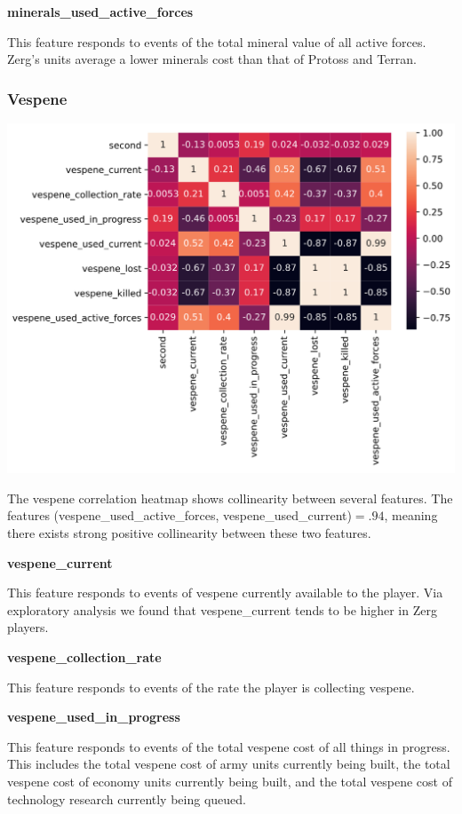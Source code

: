 \documentclass[a4paper,12pt]{report}
\newcommand{\msection}[1]{\noindent\textbf{#1}}
\begin{document}
\msection{minerals\_used\_active\_forces}

This feature responds to events of the total mineral value of all active forces. Zerg's units average a lower minerals cost than that of Protoss and Terran.

\vspace*{.5cm}
\subsubsection{Vespene}
\begin{center}
    \captionsetup{type=figure}
    \includegraphics[width=.75\linewidth]{media/vespene_types.png}
\end{center}

The vespene correlation heatmap shows collinearity between several features. The features (vespene\_used\_active\_forces, vespene\_used\_current)$ = .94$, meaning there exists strong positive collinearity between these two features.

\msection{vespene\_current}

This feature responds to events of vespene currently available to the player. Via exploratory analysis we found that vespene\_current tends to be higher in Zerg players.

\msection{vespene\_collection\_rate}

This feature responds to events of the rate the player is collecting vespene. 

\msection{vespene\_used\_in\_progress}

This feature responds to events of the total vespene cost of all things in progress. This includes the total vespene cost of army units currently being built, the total vespene cost of economy units currently being built, and the total vespene cost of technology research currently being queued.
\end{document}
